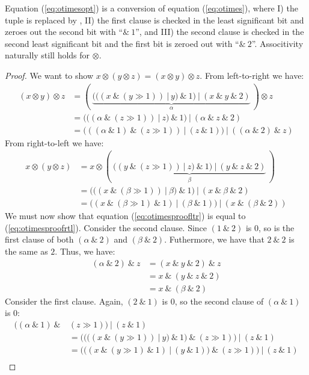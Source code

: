 Equation (\ref{eq:otimesopt}) is a conversion of equation (\ref{eq:otimes}), where I) the tuple is replaced by , II) the first clause is checked in the least significant bit and zeroes out the second bit with ``$\&~1$'', and III) the second clause is checked in the second least significant bit and the first bit is zeroed out with ``$\&~2$''. Associtivity naturally still holds for $\otimes$.

\begin{proof}
  We want to show $x \otimes (y \otimes z) = (x \otimes y) \otimes z$. From left-to-right we have:
\begin{align}
  (x \otimes y) \otimes z &= (~\underbrace{(((x~\&~(y \gg 1))~|~y)~\&~1)~|~(x~\&~y~\&~2)}_{\alpha}~) \otimes z\\
              &= (((\alpha~\&~(z \gg 1))~|~z)~\&~1)~|~(\alpha~\&~z~\&~2)\\
              \label{eq:otimesproofltr}
              &= (((\alpha~\&~1)~\&~(z \gg 1))~|~(z~\&~1))~|~((\alpha~\&~2)~\&~z)
\end{align}
From right-to-left we have:
\begin{align}
  x \otimes (y \otimes z) &= x \otimes (~\underbrace{((y~\&~(z \gg 1))~|~z)~\&~1)~|~(y~\&~z~\&~2)}_{\beta}~)\\
  &= (((x~\&~(\beta \gg 1))~|~\beta)~\&~1)~|~(x~\&~\beta~\&~2)\\
  \label{eq:otimesproofrtl}
  &= ((x~\&~(\beta \gg 1)~\&~1)~|~(\beta~\&~1))~|~(x~\&~(\beta~\&~2))
\end{align}
We must now show that equation (\ref{eq:otimesproofltr}) is equal to (\ref{eq:otimesproofrtl}). Consider the second clause. Since $(1~\&~2)$ is $0$, so is the first clause of both $(\alpha~\&~2)$ and $(\beta~\&~2)$. Futhermore, we have that $2~\&~2$ is the same as $2$. Thus, we have:
\begin{align}
  (\alpha~\&~2)~\&~z &= (x~\&~y~\&~2)~\&~z\\
                &= x~\&~(y~\&~z~\&~2)\\
                &= x~\&~(\beta~\&~2)
\end{align}
Consider the first clause. Again, $(2~\&~1)$ is $0$, so the second clause of $(\alpha~\&~1)$ is $0$:
\begin{align}
  ((\alpha~\&~1)~\&~&(z \gg 1))~|~(z~\&~1) \\
               &= ((((x~\&~(y \gg 1))~|~y)~\&~1)~\&~(z \gg 1))~|~(z~\&~1) \\
               &= (((x~\&~(y \gg 1)~\&~1)~|~(y~\&~1))~\&~(z \gg 1))~|~(z~\&~1) \\

\end{align}
\end{proof}
